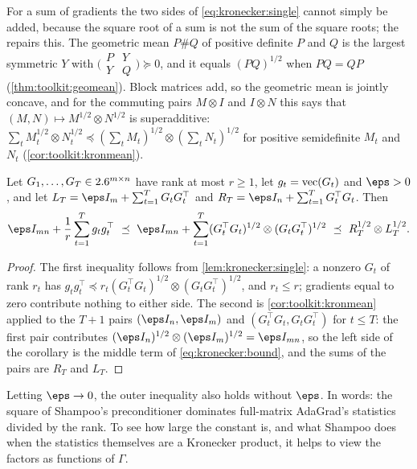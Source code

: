 \begin{refsection}
For a sum of gradients the two sides of \eqref{eq:kronecker:single} cannot simply be added, because the square root of a sum is not the sum of the square roots; the  repairs this. The geometric mean $P\#Q$ of positive definite $P$ and $Q$ is the largest symmetric $Y$ with $\bigl(\begin{smallmatrix}P&Y\\Y&Q\end{smallmatrix}\bigr)\succeq0$, and it equals $(PQ)^{1/2}$ when $PQ=QP$ (\cref{thm:toolkit:geomean}). Block matrices add, so the geometric mean is jointly concave, and for the commuting pairs $M\otimes I$ and $I\otimes N$ this says that $(M,N)\mapsto M^{1/2}\otimes N^{1/2}$ is superadditive: $\sum_tM_t^{1/2}\otimes N_t^{1/2}\preceq(\sum_tM_t)^{1/2}\otimes(\sum_tN_t)^{1/2}$ for positive semidefinite $M_t$ and $N_t$ (\cref{cor:toolkit:kronmean}).

\begin{theorem}\label{thm:kronecker:bound}
Let $G_1,\dots,G_T\in2.6^{m\times n}$ have rank at most $r\ge1$, let $g_t=\operatorname{vec}(G_t)$ and $\eps>0$, and let $L_T=\eps I_m+\sum_{t=1}^TG_tG_t^\top$ and $R_T=\eps I_n+\sum_{t=1}^TG_t^\top G_t$. Then
\begin{equation}\label{eq:kronecker:bound}
  \eps I_{mn}+\frac1r\sum_{t=1}^Tg_tg_t^\top\ \preceq\ \eps I_{mn}+\sum_{t=1}^T(G_t^\top G_t)^{1/2}\otimes(G_tG_t^\top)^{1/2}\ \preceq\ R_T^{1/2}\otimes L_T^{1/2} .
\end{equation}
\end{theorem}

\begin{proof}
The first inequality follows from \cref{lem:kronecker:single}: a nonzero $G_t$ of rank $r_t$ has $g_tg_t^\top\preceq r_t(G_t^\top G_t)^{1/2}\otimes(G_tG_t^\top)^{1/2}$, and $r_t\le r$; gradients equal to zero contribute nothing to either side. The second is \cref{cor:toolkit:kronmean} applied to the $T+1$ pairs $(\eps I_n,\eps I_m)$ and $(G_t^\top G_t,G_tG_t^\top)$ for $t\le T$: the first pair contributes $(\eps I_n)^{1/2}\otimes(\eps I_m)^{1/2}=\eps I_{mn}$, so the left side of the corollary is the middle term of \eqref{eq:kronecker:bound}, and the sums of the pairs are $R_T$ and $L_T$.
\end{proof}

Letting $\eps\to0$, the outer inequality also holds without $\eps$. In words: the square of Shampoo's preconditioner dominates full-matrix AdaGrad's statistics divided by the rank. To see how large the constant is, and what Shampoo does when the statistics themselves are a Kronecker product, it helps to view the factors as functions of $\Gamma$.


\end{refsection}
